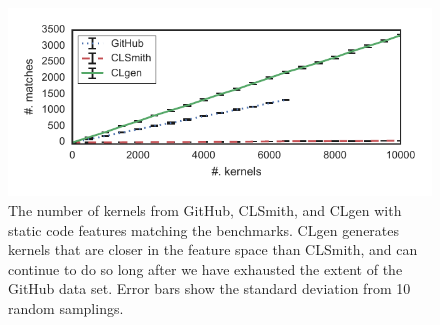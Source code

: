 \begin{figure}
  \includegraphics[width=\columnwidth]{img/closeness} %
  \caption[Number of kernels matching benchmark features]{%
    The number of kernels from GitHub, CLSmith, and CLgen with static code features matching the benchmarks. CLgen generates kernels that are closer in the feature space than CLSmith, and can continue to do so long after we have exhausted the extent of the GitHub data set. Error bars show the standard deviation from 10 random samplings.%
  }%
  \label{fig:clgen-nearest-neighbour}
\end{figure}
